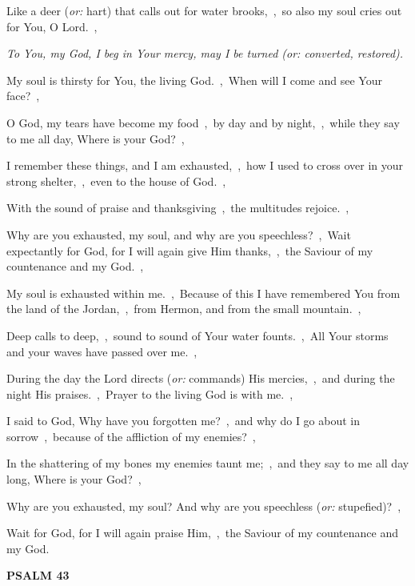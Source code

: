 \documentclass[12pt,twoside,a5paper]{article}
\newcommand{\psalm}[1]{\textbf{PSALM {#1}}\nopagebreak}
\newcommand{\qanona}[1]{{\liturgicalhint{Qanona.} \emph{#1}}}
\newcommand{\translationoption}[1]{\emph{or:} #1}
\begin{document}
\begin{normalparskip}
  Like a deer (\translationoption{hart}) that calls out for water brooks,~\sep\ so also my soul cries out for You, O Lord.~\sep

  \qanona{To You, my God, I beg in Your mercy, may I be turned (\translationoption{converted, restored}).}

  My soul is thirsty for You, the living God.~\sep\ When will I come and see Your face?~\sep

  O God, my tears have become my food~\sep\ by day and by night,~\sep\ while they say to me all day, Where is your God?~\sep

  I remember these things, and I am exhausted,~\sep\ how I used to cross over in your strong shelter,~\sep\ even to the house of God.~\sep

  With the sound of praise and thanksgiving~\sep\ the multitudes rejoice.~\sep

  Why are you exhausted, my soul, and why are you speechless?~\sep\ Wait expectantly for God, for I will again give Him thanks,~\sep\ the Saviour of my countenance and my God.~\sep

  My soul is exhausted within me.~\sep\ Because of this I have remembered You from the land of the Jordan,~\sep\ from Hermon, and from the small mountain.~\sep

  Deep calls to deep,~\sep\ sound to sound of Your water founts.~\sep\ All Your storms and your waves have passed over me.~\sep

  During the day the Lord directs (\translationoption{commands}) His mercies,~\sep\ and during the night His praises.~\sep\ Prayer to the living God is with me.~\sep

  I said to God, Why have you forgotten me?~\sep\ and why do I go about in sorrow~\sep\ because of the affliction of my enemies?~\sep

  In the shattering of my bones my enemies taunt me;~\sep\ and they say to me all day long, Where is your God?~\sep

  Why are you exhausted, my soul? And why are you speechless (\translationoption{stupefied})?~\sep

  Wait for God, for I will again praise Him,~\sep\ the Saviour of my countenance and my God.
\end{normalparskip}

\psalm{43}
\end{document}
